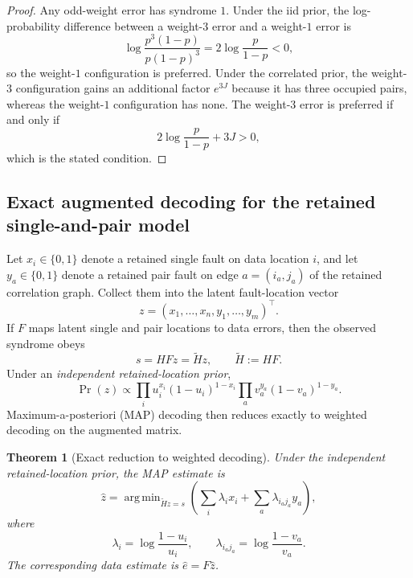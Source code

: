 \documentclass[
aps,
prx,
10pt,
twocolumn,
groupedaddress,
longbibliography,
nofootinbib,
floatfix
]{revtex4-2}
\newtheorem{theorem}{Theorem}
\theoremstyle{definition}
\DeclareMathOperator*{\argmin}{arg\,min}
\begin{document}
\begin{proof}
Any odd-weight error has syndrome $1$. Under the iid prior, the log-probability difference between a weight-$3$ error and a weight-$1$ error is
\begin{equation}
\log\frac{p^3(1-p)}{p(1-p)^3}=2\log\frac{p}{1-p}<0,
\end{equation}
so the weight-$1$ configuration is preferred. Under the correlated prior, the weight-$3$ configuration gains an additional factor $e^{3J}$ because it has three occupied pairs, whereas the weight-$1$ configuration has none. The weight-$3$ error is preferred if and only if
\begin{equation}
2\log\frac{p}{1-p}+3J>0,
\end{equation}
which is the stated condition.
\end{proof}

\subsection{Exact augmented decoding for the retained single-and-pair model}

Let $x_i\in\{0,1\}$ denote a retained single fault on data location $i$, and let $y_a\in\{0,1\}$ denote a retained pair fault on edge $a=(i_a,j_a)$ of the retained correlation graph. Collect them into the latent fault-location vector
\begin{equation}
z=\left(x_1,\ldots,x_n,y_1,\ldots,y_m\right)^\top.
\end{equation}
If $F$ maps latent single and pair locations to data errors, then the observed syndrome obeys
\begin{equation}
s=HFz=\widetilde H z,
\qquad
\widetilde H:=HF.
\end{equation}
Under an \emph{independent retained-location prior},
\begin{equation}
\Pr(z)\propto \prod_i u_i^{x_i}\left(1-u_i\right)^{1-x_i}\prod_a v_a^{y_a}\left(1-v_a\right)^{1-y_a}.
\end{equation}
Maximum-a-posteriori (MAP) decoding then reduces exactly to weighted decoding on the augmented matrix.

\begin{theorem}[Exact reduction to weighted decoding]
\label{thm:augmented}
Under the independent retained-location prior, the MAP estimate is
\begin{equation}
\hat z=\argmin_{\widetilde H z=s}\left(\sum_i \lambda_i x_i+\sum_a \lambda_{i_aj_a}y_a\right),
\label{eq:augmented-map}
\end{equation}
where
\begin{equation}
\lambda_i=\log\frac{1-u_i}{u_i},
\qquad
\lambda_{i_aj_a}=\log\frac{1-v_a}{v_a}.
\end{equation}
The corresponding data estimate is $\hat e=F\hat z$.
\end{theorem}
\end{document}
